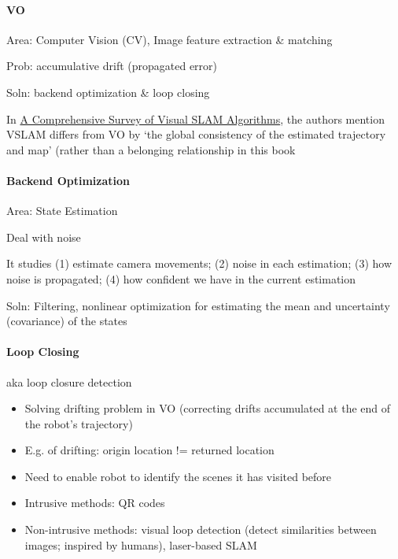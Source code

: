 \documentclass[main.tex]{subfiles}
\begin{document}
\paragraph{VO}
Area: Computer Vision (CV), Image feature extraction \& matching

Prob: accumulative drift (propagated error)

Soln: backend optimization \& loop closing

In \href{https://www.mdpi.com/2218-6581/11/1/24}{A Comprehensive Survey of Visual SLAM Algorithms}, the authors mention VSLAM differs from VO by `the global consistency of the estimated trajectory and map' (rather than a belonging relationship in this book

\paragraph{Backend Optimization}
Area: State Estimation

Deal with noise

It studies (1) estimate camera movements; (2) noise in each estimation; (3) how noise is propagated; (4) how confident we have in the current estimation

Soln: Filtering, nonlinear optimization for estimating the mean and uncertainty (covariance) of the states

\paragraph{Loop Closing} aka loop closure detection
\begin{itemize}
\item Solving drifting problem in VO (correcting drifts accumulated at the end of the robot's trajectory)
\item E.g. of drifting: origin location != returned location
\item Need to enable robot to identify the scenes it has visited before
\item Intrusive methods: QR codes
\item Non-intrusive methods: visual loop detection (detect similarities between images; inspired by humans), laser-based SLAM
\end{itemize}
\end{document}
